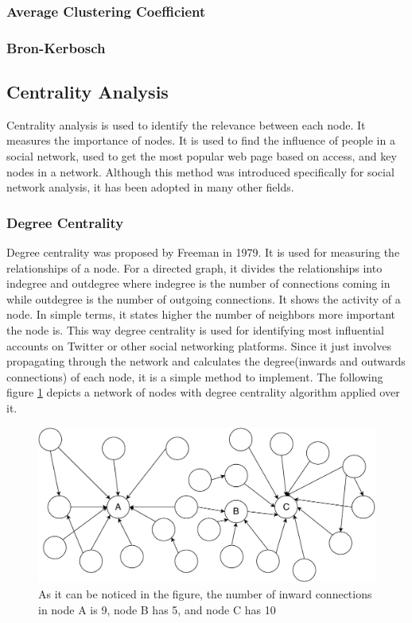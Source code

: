 \documentclass[journal,twoside,web]{ieeecolor}
\begin{document}
\subsubsection{Average Clustering Coefficient}
\subsubsection{Bron-Kerbosch}

\subsection{Centrality Analysis}
Centrality analysis is used to identify the relevance between each node. It measures the importance of nodes. It is used to find the influence of people in a social network, used to get the most popular web page based on access, and key nodes in a network. Although this method was introduced specifically for social network analysis, it has been adopted in many other fields.

\subsubsection{Degree Centrality}
Degree centrality was proposed by Freeman in 1979\cite{25}. It is used for measuring the relationships of a node. For a directed graph, it divides the relationships into indegree and outdegree where indegree is the number of connections coming in while outdegree is the number of outgoing connections. It shows the activity of a node. In simple terms, it states higher the number of neighbors more important the node is. This way degree centrality is used for identifying most influential accounts on Twitter or other social networking platforms. Since it just involves propagating through the network and calculates the degree(inwards and outwards connections) of each node, it is a simple method to implement. The following figure \ref{fig8} depicts a network of nodes with degree centrality algorithm applied over it.

\begin{figure}[!h]
    \centerline{\includegraphics[scale=0.45]{figures/degree_centrality.pdf}}
    \caption{As it can be noticed in the figure, the number of inward connections in node A is 9, node B has 5, and node C has 10}
    \label{fig8}
\end{figure}
\end{document}
